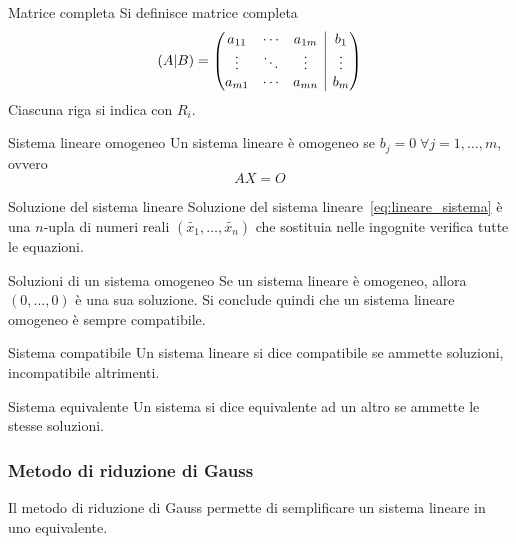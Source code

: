 \begin{Def}{Matrice completa}
  Si definisce matrice completa
  \begin{equation*}
    (A\vert B)=
    \left(
      \begin{array}{@{}ccc|c@{}}
        a_{11} & \cdots & a_{1m} & b_1\\
        \vdots & \ddots & \vdots & \vdots\\
        a_{m1} & \cdots & a_{mn} & b_m
      \end{array}
    \right)
  \end{equation*}
  Ciascuna riga si indica con $R_i$.
\end{Def}

\begin{Def}{Sistema lineare omogeneo}
  Un sistema lineare è omogeneo se $b_j=0\;\forall j=1,\ldots,m$, ovvero
  \begin{equation*}
    AX=O
  \end{equation*}
\end{Def}

\begin{Def}{Soluzione del sistema lineare}
  Soluzione del sistema lineare~\eqref{eq:lineare_sistema} è una $n$-upla di numeri
  reali $(\widetilde{x_1},\ldots,\widetilde{x_n})$ che sostituia nelle ingognite
  verifica tutte le equazioni.
\end{Def}

\begin{SubDef}{Soluzioni di un sistema omogeneo}
  Se un sistema lineare è omogeneo, allora $(0,\ldots,0)$ è una sua soluzione. Si
  conclude quindi che un sistema lineare omogeneo è sempre compatibile.
\end{SubDef}

\begin{Def}{Sistema compatibile}
  Un sistema lineare si dice compatibile se ammette soluzioni, incompatibile altrimenti.
\end{Def}

\begin{Def}{Sistema equivalente}
  Un sistema si dice equivalente ad un altro se ammette le stesse soluzioni.
\end{Def}

\subsubsection{Metodo di riduzione di Gauss}%
\label{ssub:metodo_di_riduzione_di_gauss}

Il metodo di riduzione di Gauss permette di semplificare un sistema lineare in uno
equivalente.

